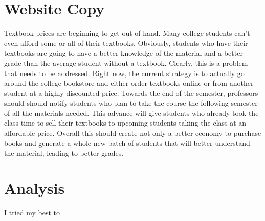 \documentclass[10pt,letterpaper]{article}
\begin{document}
\section*{Website Copy}
Textbook prices are beginning to get out of hand. Many college students can't even afford some or all of their textbooks. Obviously, students who have their textbooks are going to have a better knowledge of the material and a better grade than the average student without a textbook. Clearly, this is a problem that needs to be addressed. Right now, the current strategy is to actually go around the college bookstore and either order textbooks online or from another student at a highly discounted price. Towards the end of the semester, professors should should notify students who plan to take the course the following semester of all the materials needed. This advance will give students who already took the class time to sell their textbooks to upcoming students taking the class at an affordable price. Overall this should create not only a better economy to purchase books and generate a whole new batch of students that will better understand the material, leading to better grades. 

\section*{Analysis}

I tried my best to 
\end{document}
